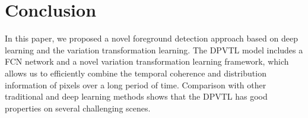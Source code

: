 \documentclass[journal]{IEEEtran}
\begin{document}
\section{Conclusion}
\label{sec6}
In this paper, we proposed a novel foreground detection approach based on deep learning and the variation transformation learning. The DPVTL model includes a FCN network and a novel variation transformation learning framework, which allows us to efficiently combine the temporal coherence and distribution information of pixels over a long period of time. Comparison with other traditional and deep learning methods shows that the DPVTL has good properties on several challenging scenes.

% 
\ifCLASSOPTIONcaptionsoff
  \newpage
\fi

  
  
\end{document}
